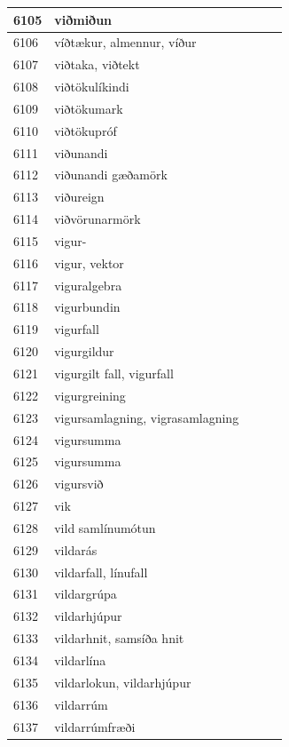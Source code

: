 \begin{longtable}{p{}|p{}|p{}|p{}|p{}}
\hline
6105 & viðmiðun &  &  &  \\
\hline
6106 & víðtækur, almennur, víður &  &  &  \\
\hline
6107 & viðtaka, viðtekt &  &  &  \\
\hline
6108 & viðtökulíkindi &  &  &  \\
\hline
6109 & viðtökumark &  &  &  \\
\hline
6110 & viðtökupróf &  &  &  \\
\hline
6111 & viðunandi &  &  &  \\
\hline
6112 & viðunandi gæðamörk &  &  &  \\
\hline
6113 & viðureign &  &  &  \\
\hline
6114 & viðvörunarmörk &  &  &  \\
\hline
6115 & vigur- &  &  &  \\
\hline
6116 & vigur, vektor &  &  &  \\
\hline
6117 & viguralgebra &  &  &  \\
\hline
6118 & vigurbundin &  &  &  \\
\hline
6119 & vigurfall &  &  &  \\
\hline
6120 & vigurgildur &  &  &  \\
\hline
6121 & vigurgilt fall, vigurfall &  &  &  \\
\hline
6122 & vigurgreining &  &  &  \\
\hline
6123 & vigursamlagning, vigrasamlagning &  &  &  \\
\hline
6124 & vigursumma &  &  &  \\
\hline
6125 & vigursumma &  &  &  \\
\hline
6126 & vigursvið &  &  &  \\
\hline
6127 & vik &  &  &  \\
\hline
6128 & vild samlínumótun &  &  &  \\
\hline
6129 & vildarás &  &  &  \\
\hline
6130 & vildarfall, línufall &  &  &  \\
\hline
6131 & vildargrúpa &  &  &  \\
\hline
6132 & vildarhjúpur &  &  &  \\
\hline
6133 & vildarhnit, samsíða hnit &  &  &  \\
\hline
6134 & vildarlína &  &  &  \\
\hline
6135 & vildarlokun, vildarhjúpur &  &  &  \\
\hline
6136 & vildarrúm &  &  &  \\
\hline
6137 & vildarrúmfræði &  &  &  \\

\end{longtable}
